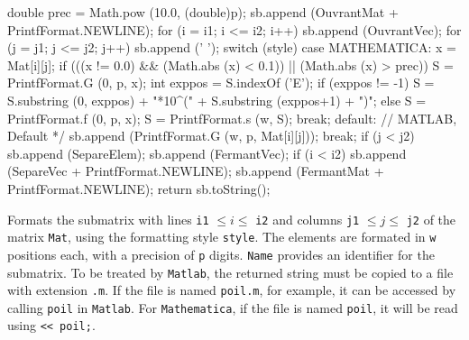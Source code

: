 \begin{code}
\begin{hide}
{      double prec = Math.pow (10.0, (double)p);
      sb.append (OuvrantMat + PrintfFormat.NEWLINE);
      for (i = i1; i <= i2; i++) {
         sb.append (OuvrantVec);
         for (j = j1; j <= j2; j++) {
            sb.append (' ');
            switch (style) {
            case MATHEMATICA:
               x = Mat[i][j];
               if (((x != 0.0) && (Math.abs (x) < 0.1)) ||
                   (Math.abs (x) > prec)) {
                  S = PrintfFormat.G (0, p, x);
                  int exppos = S.indexOf ('E');
                  if (exppos != -1)
                     S = S.substring (0, exppos) + "*10^(" +
                          S.substring (exppos+1) + ")";
               }
               else
                  S = PrintfFormat.f (0, p, x);
               S = PrintfFormat.s (w, S);
               break;
            default:
               // MATLAB, Default */
               sb.append (PrintfFormat.G (w, p, Mat[i][j]));
               break;
            }
            if (j < j2)
               sb.append (SepareElem);
         }
         sb.append (FermantVec);
         if (i < i2)
            sb.append (SepareVec + PrintfFormat.NEWLINE);
      }
      sb.append (FermantMat + PrintfFormat.NEWLINE);
      return sb.toString();
   }\end{hide}
\end{code}
 \begin{tabb} Formats the submatrix with lines
   \texttt{i1} $\le i \le $ \texttt{i2} and columns
   \texttt{j1} $\le j \le $ \texttt{j2} of the matrix \texttt{Mat}, using the
   formatting style \texttt{style}. The elements are formated in \texttt{w}
   positions each, with a precision of \texttt{p} digits.
   \texttt{Name} provides an identifier for the submatrix.
%
   To be treated by \texttt{Matlab}, the returned string
   must be copied to a file with extension \texttt{.m}.
   If the file is named \texttt{poil.m}, for example, it can be accessed by
   calling \texttt{poil} in \texttt{Matlab}.
   For \texttt{Mathematica}, if the file is named \texttt{poil},
   it will be read using \texttt{<< poil;}.
 \end{tabb}
\begin{htmlonly}
\end{htmlonly}
